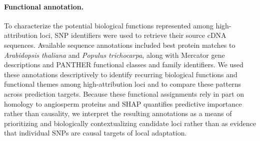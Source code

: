 \documentclass[]{article}
\begin{document}
\paragraph{Functional annotation.}
To characterize the potential biological functions represented
among high-attribution loci, SNP identifiers were used to retrieve their source
cDNA sequences. Available sequence annotations included best protein matches
to \textit{Arabidopsis thaliana} and \textit{Populus trichocarpa},
along with Mercator gene descriptions and PANTHER functional classes and family
identifiers. We used these annotations descriptively to identify recurring biological
functions and functional themes among high-attribution loci and to compare these patterns
across prediction targets. Because these functional assignments rely in part on
homology to angiosperm proteins and SHAP quantifies predictive importance
rather than causality, we interpret the resulting annotations as a means of
prioritizing and biologically contextualizing candidate loci rather than as
evidence that individual SNPs are causal targets of local adaptation.

\end{document}
